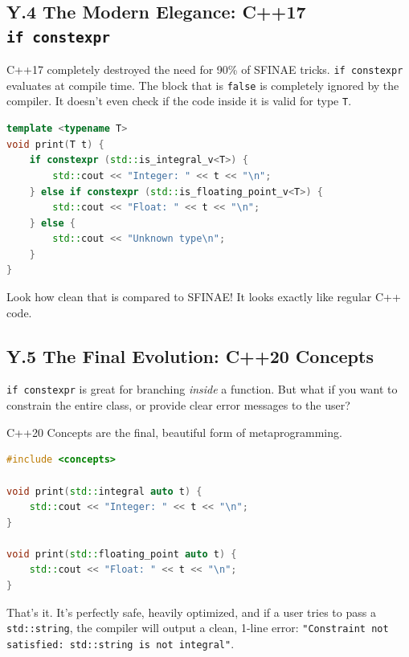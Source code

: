 \hypertarget{y.4-the-modern-elegance-c17-if-constexpr}{%
\subsection{\texorpdfstring{Y.4 The Modern Elegance: C++17
\texttt{if\ constexpr}}{Y.4 The Modern Elegance: C++17 if constexpr}}\label{y.4-the-modern-elegance-c17-if-constexpr}}

C++17 completely destroyed the need for 90\% of SFINAE tricks.
\passthrough{\lstinline!if constexpr!} evaluates at compile time. The
block that is \passthrough{\lstinline!false!} is completely ignored by
the compiler. It doesn't even check if the code inside it is valid for
type \passthrough{\lstinline!T!}.

\begin{lstlisting}[language={C++}]
template <typename T>
void print(T t) {
    if constexpr (std::is_integral_v<T>) {
        std::cout << "Integer: " << t << "\n";
    } else if constexpr (std::is_floating_point_v<T>) {
        std::cout << "Float: " << t << "\n";
    } else {
        std::cout << "Unknown type\n";
    }
}
\end{lstlisting}

Look how clean that is compared to SFINAE! It looks exactly like regular
C++ code.

\hypertarget{y.5-the-final-evolution-c20-concepts}{%
\subsection{Y.5 The Final Evolution: C++20
Concepts}\label{y.5-the-final-evolution-c20-concepts}}

\passthrough{\lstinline!if constexpr!} is great for branching
\emph{inside} a function. But what if you want to constrain the entire
class, or provide clear error messages to the user?

C++20 Concepts are the final, beautiful form of metaprogramming.

\begin{lstlisting}[language={C++}]
#include <concepts>

void print(std::integral auto t) {
    std::cout << "Integer: " << t << "\n";
}

void print(std::floating_point auto t) {
    std::cout << "Float: " << t << "\n";
}
\end{lstlisting}

That's it. It's perfectly safe, heavily optimized, and if a user tries
to pass a \passthrough{\lstinline!std::string!}, the compiler will
output a clean, 1-line error:
\passthrough{\lstinline!"Constraint not satisfied: std::string is not integral"!}.

